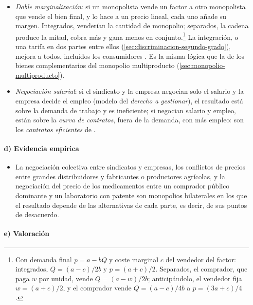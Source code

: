 \documentclass[11pt]{article}
\begin{document}
\begin{itemize}
\item \emph{Doble marginalización}\nocite{Spengler1950Vertical}: si un monopolista vende un factor a otro monopolista que vende el bien final, y lo hace a un precio lineal, cada uno añade su margen. Integrados, venderían la cantidad de monopolio; separados, la cadena produce la mitad, cobra más y gana menos en conjunto.\footnote{Con demanda final $p=a-bQ$ y coste marginal $c$ del vendedor del factor: integrados, $Q=(a-c)/2b$ y $p=(a+c)/2$. Separados, el comprador, que paga $w$ por unidad, vende $Q=(a-w)/2b$; anticipándolo, el vendedor fija $w=(a+c)/2$, y el comprador vende $Q=(a-c)/4b$ a $p=(3a+c)/4$.} La integración, o una tarifa en dos partes entre ellos (\ref{sec:discriminacion-segundo-grado}), mejora a todos, incluidos los consumidores . Es la misma lógica que la de los bienes complementarios del monopolio multiproducto (\ref{sec:monopolio-multiproducto}).
\item \emph{Negociación salarial}: si el sindicato y la empresa negocian solo el salario y la empresa decide el empleo (modelo del \emph{derecho a gestionar}), el resultado está sobre la demanda de trabajo y es ineficiente; si negocian salario y empleo, están sobre la \emph{curva de contratos}, fuera de la demanda, con más empleo: son los \emph{contratos eficientes} de \textcite{McDonaldSolow1981Wage} .
\end{itemize}

\paragraph{d) Evidencia empírica}

\begin{itemize}
\item La negociación colectiva entre sindicatos y empresas, los conflictos de precios entre grandes distribuidores y fabricantes o productores agrícolas, y la negociación del precio de los medicamentos entre un comprador público dominante y un laboratorio con patente son monopolios bilaterales en los que el resultado depende de las alternativas de cada parte, es decir, de sus puntos de desacuerdo.
\end{itemize}

\paragraph{e) Valoración}
\end{document}
